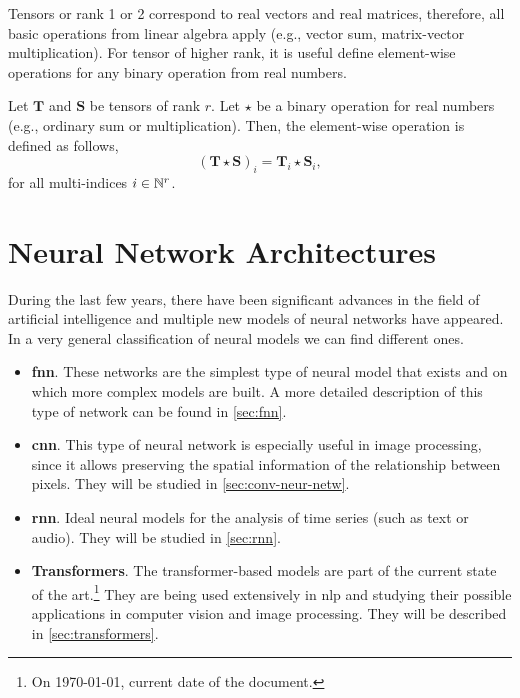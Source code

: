 Tensors or rank 1 or 2 correspond to real vectors and real matrices, therefore,
all basic operations from linear algebra apply (e.g., vector sum, matrix-vector
multiplication). For tensor of higher rank, it is useful define element-wise
operations for any binary operation from real numbers.

Let \(\mathbf{T}\) and \(\mathbf{S}\) be tensors of rank \(r\). Let \(\star\)
be a binary operation for real numbers (e.g., ordinary sum or
multiplication). Then, the element-wise operation is defined as follows,
\begin{equation}
  (\mathbf{T} \star \mathbf{S})_i = \mathbf{T}_i \star \mathbf{S}_i,
\end{equation}
for all multi-indices \(i \in \mathbb{N}^r\).



\section{Neural Network Architectures}

During the last few years, there have been significant advances in the field of
artificial intelligence and multiple new models of neural networks have
appeared. In a very general classification of neural models we can find
different ones.

\begin{itemize}
  \item \textbf{\acl*{fnn}}. These networks are the simplest type of neural
  model that exists and on which more complex models are built. A more detailed
  description of this type of network can be found in
  \vref{sec:fnn}.
  \item \textbf{\acl*{cnn}}. This type of neural network is especially useful
  in image processing, since it allows preserving the spatial information of
  the relationship between pixels. They will be studied in
  \vref{sec:conv-neur-netw}.
  \item \textbf{\acl*{rnn}}. Ideal neural models for the analysis of time
  series (such as text or audio). They will be studied in
  \vref{sec:rnn}.
  \item \textbf{Transformers}. The transformer-based models are part of the
  current state of the art.\footnote{On \today, current date of the document.}
  They are being used extensively in \gls{nlp} and studying their possible
  applications in computer vision and image processing. They will be described
  in \vref{sec:transformers}.
\end{itemize}


